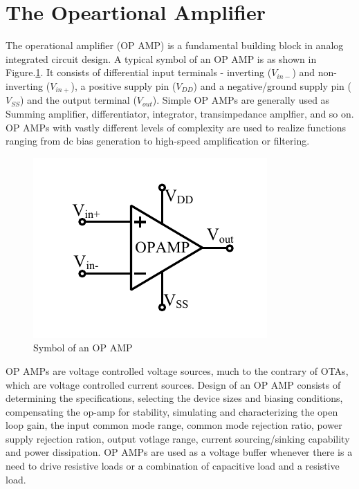 \vfill
\clearpage

\section{The Opeartional Amplifier}
The operational amplifier (OP AMP) is a fundamental building block in analog integrated circuit design. A typical symbol of an OP AMP is as shown in Figure.\ref{fig:OPAMP_symbol}. It consists of differential input terminals - inverting ($V_{in-}$) and non-inverting ($V_{in+}$), a positive supply pin ($V_{DD}$) and a negative/ground supply pin ($V_{SS}$) and the output terminal ($V_{out}$). Simple OP AMPs are generally used as Summing amplifier, differentiator, integrator, transimpedance amplfier, and so on. OP AMPs with vastly different levels of complexity are used to realize functions ranging from dc bias generation to high-speed amplification or filtering.

\begin{figure} [H]
\centering
\includegraphics[scale=1]{Figures/System_Level/OPAMP_Symbol.pdf}
\caption{Symbol of an OP AMP}
\label{fig:OPAMP_symbol}
\end{figure}

OP AMPs are voltage controlled voltage sources, much to the contrary of OTAs, which are voltage controlled current sources. Design of an OP AMP consists of determining the specifications, selecting the device sizes and biasing conditions, compensating the op-amp for stability, simulating and characterizing the open loop gain, the input common mode range, common mode rejection ratio, power supply rejection ration, output votlage range, current sourcing/sinking capability and power dissipation.
OP AMPs are used as a voltage buffer whenever there is a need to drive resistive loads or a combination of capacitive load and a resistive load.

